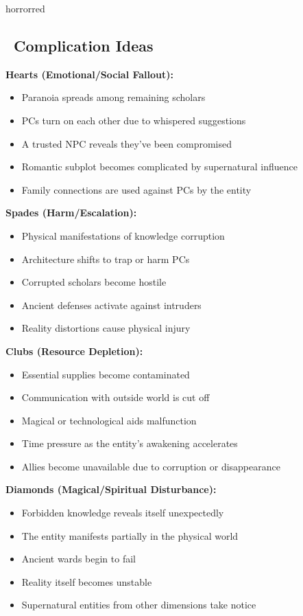 \documentclass[11pt]{article}
\begin{document}
\begin{campaignsection}{horrorred}
\subsection*{\faBolt\ Complication Ideas}

\textbf{Hearts (Emotional/Social Fallout):}
\begin{itemize}
    \item Paranoia spreads among remaining scholars
    \item PCs turn on each other due to whispered suggestions
    \item A trusted NPC reveals they've been compromised
    \item Romantic subplot becomes complicated by supernatural influence
    \item Family connections are used against PCs by the entity
\end{itemize}

\textbf{Spades (Harm/Escalation):}
\begin{itemize}
    \item Physical manifestations of knowledge corruption
    \item Architecture shifts to trap or harm PCs
    \item Corrupted scholars become hostile
    \item Ancient defenses activate against intruders
    \item Reality distortions cause physical injury
\end{itemize}

\textbf{Clubs (Resource Depletion):}
\begin{itemize}
    \item Essential supplies become contaminated
    \item Communication with outside world is cut off
    \item Magical or technological aids malfunction
    \item Time pressure as the entity's awakening accelerates
    \item Allies become unavailable due to corruption or disappearance
\end{itemize}

\textbf{Diamonds (Magical/Spiritual Disturbance):}
\begin{itemize}
    \item Forbidden knowledge reveals itself unexpectedly
    \item The entity manifests partially in the physical world
    \item Ancient wards begin to fail
    \item Reality itself becomes unstable
    \item Supernatural entities from other dimensions take notice
\end{itemize}
\end{campaignsection}
\end{document}
